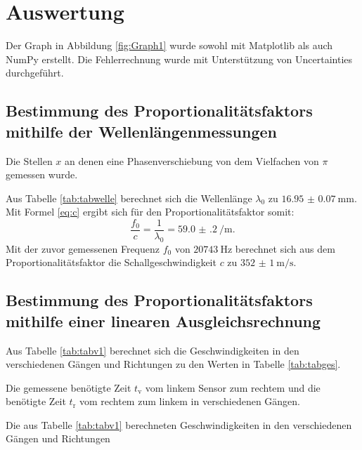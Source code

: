 \section{Auswertung}
\label{sec:Auswertung}

Der Graph in Abbildung \ref{fig:Graph1} wurde sowohl mit Matplotlib \cite{matplotlib} als auch NumPy \cite{numpy} erstellt. Die Fehlerrechnung wurde mit Unterstützung von Uncertainties \cite{uncertainties} durchgeführt.

\subsection{Bestimmung des Proportionalitätsfaktors mithilfe der Wellenlängenmessungen}
\begin{table}
	\centering
	\caption{Die Stellen $x$ an denen eine Phasenverschiebung von dem Vielfachen von $\pi$ gemessen wurde.}
	
\end{table}
Aus Tabelle \ref{tab:tabwelle} berechnet sich die Wellenlänge $\lambda_0$ zu $\SI{16.95(7)}{\milli\meter}$. Mit Formel \eqref{eq:c} ergibt sich für den Proportionalitätsfaktor somit:
\begin{displaymath}
	\frac{f_0}{c} = \frac{1}{\lambda_0} = \SI{59.0(2)}{\per\meter}\text{.}
\end{displaymath}
Mit der zuvor gemessenen Frequenz $f_0$ von $\SI{20743}{\hertz}$ berechnet sich aus dem Proportionalitätsfaktor die Schallgeschwindigkeit $c$ zu $\SI{352(1)}{\meter\per\second}$.

\subsection{Bestimmung des Proportionalitätsfaktors  mithilfe einer linearen Ausgleichsrechnung}
Aus Tabelle \ref{tab:tabv1} berechnet sich die Geschwindigkeiten in den verschiedenen Gängen und Richtungen zu den Werten in Tabelle \ref{tab:tabges}.
\begin{table}
	\caption{Die gemessene benötigte Zeit $t_\text{v}$ vom linkem Sensor zum rechtem und die benötigte Zeit $t_\text{r}$ vom rechtem zum linkem in verschiedenen Gängen.}
	\begin{minipage}{0.5\textwidth}
		\centering
		
	\end{minipage}
	\begin{minipage}{0.5\textwidth}
		\centering
		
	\end{minipage}
\end{table}
\begin{table}
	\centering
	\caption{Die aus Tabelle \ref{tab:tabv1} berechneten Geschwindigkeiten in den verschiedenen Gängen und Richtungen}
	
\end{table}

